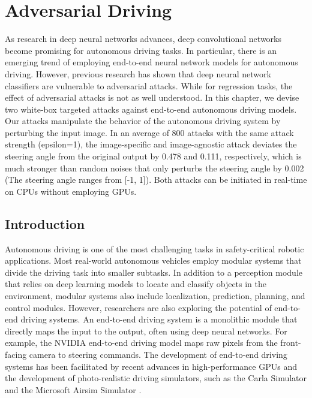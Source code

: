 \chapter{Adversarial Driving}
\label{chpt:driving}


As research in deep neural networks advances, deep convolutional networks become promising for autonomous driving tasks. In particular, there is an emerging trend of employing end-to-end neural network models for autonomous driving. However, previous research has shown that deep neural network classifiers are vulnerable to adversarial attacks. While for regression tasks, the effect of adversarial attacks is not as well understood. In this chapter, we devise two white-box targeted attacks against end-to-end autonomous driving models. Our attacks manipulate the behavior of the autonomous driving system by perturbing the input image. In an average of 800 attacks with the same attack strength (epsilon=1), the image-specific and image-agnostic attack deviates the steering angle from the original output by 0.478 and 0.111, respectively, which is much stronger than random noises that only perturbs the steering angle by 0.002 (The steering angle ranges from [-1, 1]). Both attacks can be initiated in real-time on CPUs without employing GPUs. 



\section{Introduction}

Autonomous driving is one of the most challenging tasks in safety-critical robotic applications. Most real-world autonomous vehicles employ modular systems that divide the driving task into smaller subtasks. In addition to a perception module that relies on deep learning models to locate and classify objects in the environment, modular systems also include localization, prediction, planning, and control modules. However, researchers are also exploring the potential of end-to-end driving systems. An end-to-end driving system is a monolithic module that directly maps the input to the output, often using deep neural networks. For example, the NVIDIA end-to-end driving model \citep{bojarski2016end} maps raw pixels from the front-facing camera to steering commands. The development of end-to-end driving systems has been facilitated by recent advances in high-performance GPUs and the development of photo-realistic driving simulators, such as the Carla Simulator \citep{Dosovitskiy17} and the Microsoft Airsim Simulator \citep{airsim2017fsr}.  

